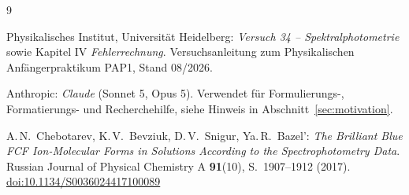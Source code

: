 \documentclass{article}
\let\OrigRef\ref
\renewcommand{\ref}[1]{{\color{linkblue}\uline{\OrigRef{#1}}}}
\begin{document}
\begingroup
\renewcommand{\section}[2]{}
\begin{thebibliography}{9}

	Physikalisches Institut, Universität Heidelberg:
	\emph{Versuch 34 -- Spektralphotometrie} sowie Kapitel IV
	\emph{Fehlerrechnung}. Versuchsanleitung zum Physikalischen
	Anfängerpraktikum PAP1, Stand 08/2026.

	Anthropic: \emph{Claude} (Sonnet 5, Opus 5).
	Verwendet für Formulierungs-, Formatierungs- und Recherchehilfe,
	siehe Hinweis in Abschnitt~\ref{sec:motivation}.

	A.\,N.~Chebotarev, K.\,V.~Bevziuk, D.\,V.~Snigur, Ya.\,R.~Bazel':
	\emph{The Brilliant Blue FCF Ion-Molecular Forms in Solutions According
	to the Spectrophotometry Data}. Russian Journal of Physical Chemistry A
	\textbf{91}(10), S.~1907--1912 (2017).
	\href{https://doi.org/10.1134/S0036024417100089}{doi:10.1134/S0036024417100089}

\end{thebibliography}
\endgroup
\end{document}

